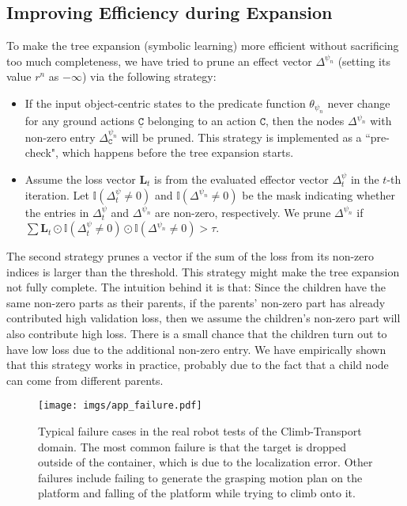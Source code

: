 \subsection{Improving Efficiency during Expansion}\label{app:pruning}
To make the tree expansion (symbolic learning) more efficient without sacrificing too much completeness, we have tried to prune an effect vector $\Delta^{\psi_n}$ (setting its value $r^n$ as $-\infty$) via the following strategy:
\begin{itemize}
    \item If the input object-centric states to the predicate function $\theta_{\psi_n}$ never change for any ground actions $\underline{\mathtt{C}}$ belonging to an action $\mathtt{C}$, then the nodes $\Delta^{\psi_n}$ with non-zero entry $\Delta^{\psi_n}_\mathtt{C}$ will be pruned. This strategy is implemented as a ``pre-check", which happens before the tree expansion starts.
    \item Assume the loss vector $\mathbf{L}_t$ is from the evaluated effector vector $\Delta^\psi_t$ in the $t$-th iteration. Let $\mathbb{I}(\Delta^{\psi}_t \neq 0)$ and $\mathbb{I}(\Delta^{\psi_n} \neq 0)$ be the mask indicating whether the entries in $\Delta^\psi_t$ and $\Delta^{\psi_n}$ are non-zero, respectively. We prune $\Delta^{\psi_n}$ if $\sum \mathbf{L}_t\odot\mathbb{I}(\Delta^{\psi}_t \neq 0)\odot\mathbb{I}(\Delta^{\psi_n} \neq 0) > \tau$.
\end{itemize}
The second strategy prunes a vector if the sum of the loss from its non-zero indices is larger than the threshold. 
This strategy might make the tree expansion not fully complete. 
The intuition behind it is that: Since the children have the same non-zero parts as their parents, if the parents' non-zero part has already contributed high validation loss, then we assume the children's non-zero part will also contribute high loss. 
There is a small chance that the children turn out to have low loss due to the additional non-zero entry.
We have empirically shown that this strategy works in practice, probably due to the fact that a child node can come from different parents.

\begin{figure*}[!t]
	\centering
	\texttt{[image: imgs/app\_failure.pdf]}
 \vspace{-0.1cm}
	\caption{Typical failure cases in the real robot tests of the Climb-Transport domain. The most common failure is that the target is dropped outside of the container, which is due to the localization error. Other failures include failing to generate the grasping motion plan on the platform and falling of the platform while trying to climb onto it.}
 \vspace{-0.1cm}
	\label{fig:app_failure}
\end{figure*}

